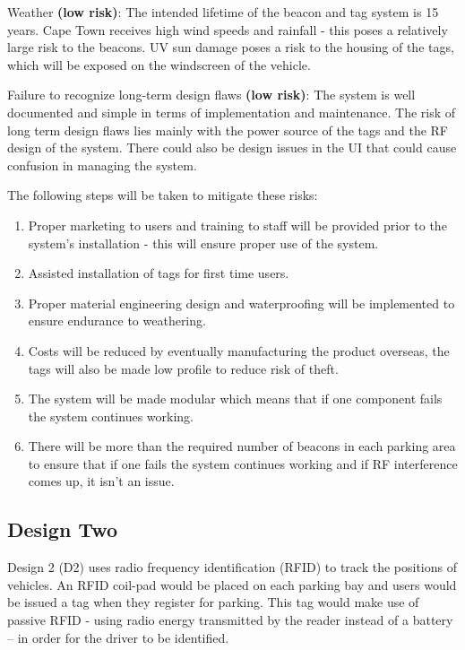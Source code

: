 Weather \textbf{(low risk)}: The intended lifetime of the beacon and tag system is 15 years. Cape Town receives high wind speeds and rainfall - this poses a relatively large risk to the beacons. UV sun damage poses a risk to the housing of the tags, which will be exposed on the windscreen of the vehicle. 

Failure to recognize long-term design flaws \textbf{(low risk)}: The system is well documented and simple in terms of implementation and maintenance. The risk of long term design flaws lies mainly with the power source of the tags and the RF design of the system. There could also be design issues in the UI that could cause confusion in managing the system.

\newpage
{}
The following steps will be taken to mitigate these risks:

\begin{enumerate}
\item Proper marketing to users and training to staff will be provided prior to the system's installation - this will ensure proper use of the system.
\item Assisted installation of tags for first time users.
\item Proper material engineering design and waterproofing will be implemented to ensure endurance to weathering.
\item Costs will be reduced by eventually manufacturing the product overseas, the tags will also be made low profile to reduce risk of theft.
\item The system will be made modular which means that if one component fails the system continues working. 
\item There will be more than the required number of beacons in each parking area to ensure that if one fails the system continues working and if RF interference comes up, it isn't an issue.
\end{enumerate}

\newpage
\subsection{Design Two}
Design 2 (D2) uses radio frequency identification (RFID) to track the positions of vehicles. An RFID coil-pad would be placed on each parking bay and users would be issued a tag when they register for parking. This tag would make use of passive RFID - using radio energy transmitted by the reader instead of a battery – in order for the driver to be identified.

